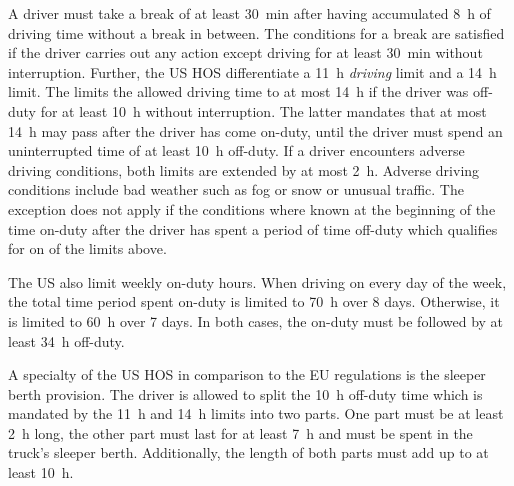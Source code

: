A driver must take a break of at least \SI{30}{\minute} after having accumulated \SI{8}{\hour} of driving time without a break in between. The conditions for a break are satisfied if the driver carries out any action except driving for at least \SI{30}{\minute} without interruption. Further, the US HOS differentiate a \SI{11}{\hour} \emph{driving} limit and a \SI{14}{\hour} limit. The limits the allowed driving time to at most \SI{14}{\hour} if the driver was off-duty for at least \SI{10}{\hour} without interruption. The latter mandates that at most \SI{14}{\hour} may pass after the driver has come on-duty, until the driver must spend an uninterrupted time of at least \SI{10}{\hour} off-duty. If a driver encounters adverse driving conditions, both limits are extended by at most \SI{2}{\hour}. Adverse driving conditions include bad weather such as fog or snow or unusual traffic. The exception does not apply if the conditions where known at the beginning of the time on-duty after the driver has spent a period of time off-duty which qualifies for on of the limits above.

The US also limit weekly on-duty hours. When driving on every day of the week, the total time period spent on-duty is limited to \SI{70}{\hour} over 8 days. Otherwise, it is limited to \SI{60}{\hour} over 7 days. In both cases, the on-duty must be followed by at least \SI{34}{\hour} off-duty.

A specialty of the US HOS in comparison to the EU regulations is the sleeper berth provision. The driver is allowed to split the \SI{10}{\hour} off-duty time which is mandated by the \SI{11}{\hour} and \SI{14}{\hour} limits into two parts. One part must be at least \SI{2}{\hour} long, the other part must last for at least \SI{7}{\hour} and must be spent in the truck's sleeper berth. Additionally, the length of both parts must add up to at least \SI{10}{\hour}.

